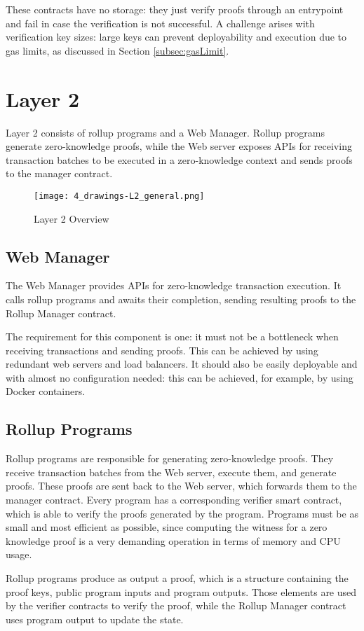 These contracts have no storage: they just verify proofs through an entrypoint and fail in case the verification is not successful. A challenge arises with verification key sizes: large keys can prevent deployability and execution due to gas limits, as discussed in Section \ref{subsec:gasLimit}.

\section{Layer 2\label{sec:designLayer2}}
Layer 2 consists of rollup programs and a Web Manager. Rollup programs generate zero-knowledge proofs, while the Web server exposes APIs for receiving transaction batches to be executed in a zero-knowledge context and sends proofs to the manager contract.

\begin{figure}[htb]
  \centering
  \texttt{[image: 4\_drawings-L2\_general.png]}
  \caption{Layer 2 Overview}
  \label{fig:Layer2overview}
\end{figure}

\subsection{Web Manager\label{sec:designwebserver}}
The Web Manager provides APIs for zero-knowledge transaction execution. It calls rollup programs and awaits their completion, sending resulting proofs to the Rollup Manager contract.

The requirement for this component is one: it must not be a bottleneck when receiving transactions and sending proofs. This can be achieved by using redundant web servers and load balancers. It should also be easily deployable and with almost no configuration needed: this can be achieved, for example, by using Docker containers.

\subsection{Rollup Programs\label{sec:designrollupprograms}}
Rollup programs are responsible for generating zero-knowledge proofs. They receive transaction batches from the Web server, execute them, and generate proofs. These proofs are sent back to the Web server, which forwards them to the manager contract. Every program has a corresponding verifier smart contract, which is able to verify the proofs generated by the program. Programs must be as small and most efficient as possible, since computing the witness for a zero knowledge proof is a very demanding operation in terms of memory and CPU usage.

Rollup programs produce as output a proof, which is a structure containing the proof keys, public program inputs and program outputs. Those elements are used by the verifier contracts to verify the proof, while the Rollup Manager contract uses program output to update the state.
